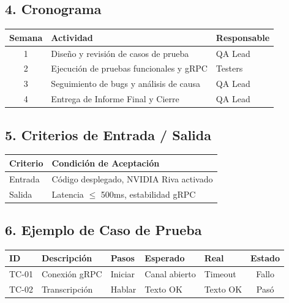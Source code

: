 \documentclass[12pt,a4paper]{article}
\begin{document}
\subsection{4. Cronograma}
\begin{table}[h!]
\centering
\begin{tabular}{|c|l|l|}
\hline
\rowcolor{headergrey} \textbf{Semana} & \textbf{Actividad} & \textbf{Responsable} \\ \hline
1 & Diseño y revisión de casos de prueba & QA Lead \\ \hline
2 & Ejecución de pruebas funcionales y gRPC & Testers \\ \hline
3 & Seguimiento de bugs y análisis de causa & QA Lead \\ \hline
4 & Entrega de Informe Final y Cierre & QA Lead \\ \hline
\end{tabular}
\end{table}

\subsection{5. Criterios de Entrada / Salida}
\begin{table}[h!]
\centering
\begin{tabular}{|l|l|}
\hline
\rowcolor{headergrey} \textbf{Criterio} & \textbf{Condición de Aceptación} \\ \hline
Entrada & Código desplegado, NVIDIA Riva activado \\ \hline
Salida & Latencia $\leq$ 500ms, estabilidad gRPC \\ \hline
\end{tabular}
\end{table}

\subsection{6. Ejemplo de Caso de Prueba}
\begin{table}[h!]
\centering
\small
\renewcommand{\arraystretch}{1.3}
\begin{tabular}{|l|l|l|l|l|c|}
\hline
\rowcolor{headergrey} \textbf{ID} & \textbf{Descripción} & \textbf{Pasos} & \textbf{Esperado} & \textbf{Real} & \textbf{Estado} \\ \hline
TC-01 & Conexión gRPC & Iniciar & Canal abierto & Timeout & \cellcolor{statusred} Fallo \\ \hline
TC-02 & Transcripción & Hablar & Texto OK & Texto OK & \cellcolor{statusgreen} Pasó \\ \hline
\end{tabular}
\end{table}
\end{document}
